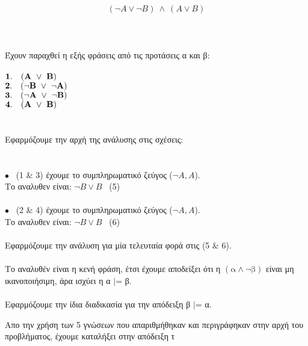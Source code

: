 \documentclass[10pt]{article}
\begin{document}
\[
(\neg A \vee \neg B) \ \wedge \ ( A \vee  B)
\] \\ \\ \\
Έχουν παραχθεί η εξής φράσεις από τις προτάσεις α και β: \\ \\
$\bf 1. \normalfont \ \ \  ( A \ \vee \ B)
 $ \\
$ \\
\bf 2. \normalfont \ \ \ ( \neg B \ \vee \ \neg A)
 $ \\
 $ \\
 \bf 3. \normalfont \ \ \  (\neg A \ \vee \  \neg B)
 $ \\
$ \\
\bf 4. \normalfont \ \ \ ( A \ \vee \ B)
 $ \\ \\ \\

 
Εφαρμόζουμε την αρχή της ανάλυσης στις σχέσεις: \\ \\ \\

$\bullet$ \ (1 \&  3) έχουμε το συμπληρωματικό ζεύγος ($\neg A, A$). \\

\hspace{5mm}Το αναλυθεν είναι: $\neg B \vee B$ \ (5) \\ \\ 

$\bullet$ \ (2 \&  4) έχουμε το συμπληρωματικό ζεύγος ($\neg A, A$). \\

\hspace{5mm}Το αναλυθεν είναι: $\neg B \vee B$ \ (6) \\ \\ 
Εφαρμόζουμε την ανάλυση για μία τελευταία φορά στις  (5 \&  6). \\ \\
\hspace{5mm}Το αναλυθέν είναι η κενή φράση, έτσι έχουμε αποδείξει ότι η $( \text{α} \wedge \neg \text{β} ) $ είναι μη ικανοποιήσιμη, άρα ισχύει  η α $|$= β. \\ \\
Εφαρμόζουμε την ίδια διαδικασία για την απόδειξη β $|$= α.

Απο την χρήση των 5 γνώσεων που απαριθμήθηκαν και περιγράφηκαν στην αρχή του προβλήματος, έχουμε καταλήξει στην απόδειξη τ
 
\end{document}
